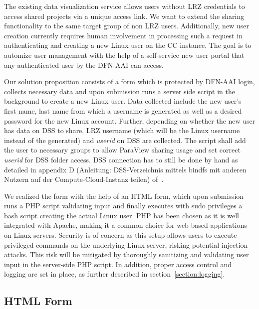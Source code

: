 The existing data visualization service allows users without LRZ credentials to
access shared projects via a unique access link. We want to extend the sharing
functionality to the same target group of non LRZ users. Additionally, new user
creation currently requires human involvement in processing such a request in
authenticating and creating a new Linux user on the CC instance. The goal is to
automize user management with the help of a self-service new user portal that
any authenticated user by the DFN-AAI can access. 

Our solution proposition consists of a form which is protected by DFN-AAI login,
collects necessary data and upon submission runs a server side script in the
background to create a new Linux user. Data collected include the new user's
first name, last name from which a username is generated as well as a desired
password for the new Linux account. Further, depending on whether the new user
has data on DSS to share, LRZ username (which will be the Linux username instead
of the generated) and \textit{userid} on DSS are collected. The script shall add
the user to necessary groups to allow ParaView sharing usage and set correct
\textit{userid} for DSS folder access. DSS connection has to still be done by
hand as detailed in appendix D (Anleitung: DSS-Verzeichnis mittels bindfs mit
anderen Nutzern auf der Compute-Cloud-Instanz teilen) of~\cite{nowak2024pvw}.

We realized the form with the help of an HTML form, which upon submission runs a
PHP script validating input and finally executes with sudo privileges a bash
script creating the actual Linux user. PHP has been chosen as it is well
integrated with Apache, making it a common choice for web-based applications on
Linux servers. Security is of concern as this setup allows users to execute
privileged commands on the underlying Linux server, risking potential injection
attacks. This risk will be mitigated by thoroughly sanitizing and validating
user input in the server-side PHP script. In addition, proper access control and
logging are set in place, as further described in section~\ref{section:logging}.

\subsection{HTML Form}



